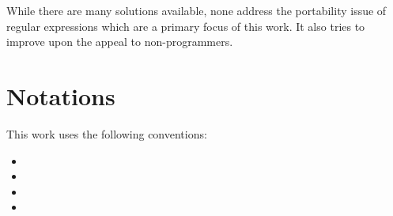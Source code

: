 While there are many solutions available, none address the portability issue of regular expressions which are a primary focus of this work. It also tries to improve upon the appeal to non-programmers.

\section{Notations}

This work uses the following conventions:

\begin{itemize}
    \item {}
    \item {}
    \item {}
    \item {}
\end{itemize}
